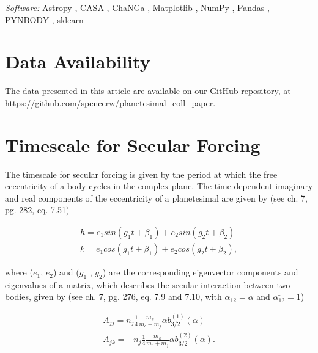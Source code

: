 \documentclass[fleqn,usenatbib]{mnras}
\begin{document}
\textit{Software:} Astropy \citep{2013A&A...558A..33A}, {\sc CASA} \citep{2007ASPC..376..127M}, {\sc ChaNGa} \citep{2008IEEEpds...ChaNGa, 2015AphCom..2..1}, Matplotlib 
\citep{2007CSE.....9...90H}, NumPy \citep{2011CSE....13b..22V}, Pandas \citep{mckinney-proc-scipy-2010}, {\sc PYNBODY} \citep{2013ascl.soft05002P}, {\sc sklearn} \citep{scikit-learn}

\section*{Data Availability}
The data presented in this article are available on our GitHub repository, at \url{https://github.com/spencerw/planetesimal_coll_paper}.




\appendix
\section{Timescale for Secular Forcing}\label{sec:sec_forcing_timescale}

The timescale for secular forcing is given by the period at which the free eccentricity of a body cycles in the complex plane. The time-dependent imaginary and real components of 
the eccentricity of a planetesimal are given by \citet{1999ssd..book.....M} (see ch. 7, pg. 282, eq. 7.51)

\begin{eqnarray}\label{eq:kandh}
	h = e_{1} sin (g_{1} t + \beta_{1}) + e_{2} sin (g_{2} t + \beta_{2}) \\ \nonumber
	k = e_{1} cos (g_{1} t + \beta_{1}) + e_{2} cos (g_{2} t + \beta_{2}),
\end{eqnarray}

\noindent where  ($e_{1}$, $e_{2}$) and ($g_{1}$ , $g_{2}$) are the corresponding eigenvector components and eigenvalues of a matrix, which describes the secular interaction 
between two bodies, given by \citet{1999ssd..book.....M} (see ch. 7, pg. 276, eq. 7.9 and 7.10, with $\alpha_{12} = \alpha$ and $\bar{\alpha_{12}} = 1$)

\begin{eqnarray}\label{eq:pert_matrix}
	A_{jj} = n_{j} \frac{1}{4} \frac{m_{k}}{m_{c} + m_{j}} \alpha b_{3/2}^{(1)} (\alpha) \\ \nonumber
	A_{jk} = -n_{j} \frac{1}{4} \frac{m_{k}}{m_{c} + m_{j}} \alpha b_{3/2}^{(2)} (\alpha).
\end{eqnarray}
\end{document}

